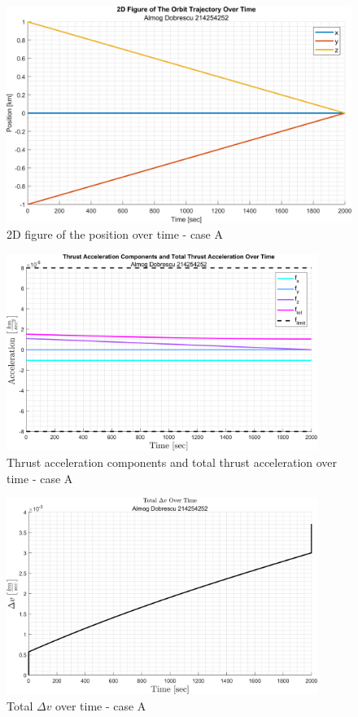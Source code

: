 \documentclass[11pt, a4paper]{article}
\begin{document}
\begin{figure}[H]
    \centering
    \includegraphics[width=1\textwidth]{images/graph2.png}
    \caption{2D figure of the position over time - case A}
    \label{fig:2D-plot_over_time-caseA}
\end{figure}
\begin{figure}[H]
    \centering
    \includegraphics[width=0.9\textwidth]{images/graph3.png}
    \caption{Thrust acceleration components and total thrust acceleration over time - case A}
    \label{fig:accel_over_time-caseA}
\end{figure}
\begin{figure}[H]
    \centering
    \includegraphics[width=0.9\textwidth]{images/graph4.png}
    \caption{Total $\Delta v$ over time - case A}
    \label{fig:delta_v_over_time-caseA}
\end{figure}
\end{document}
